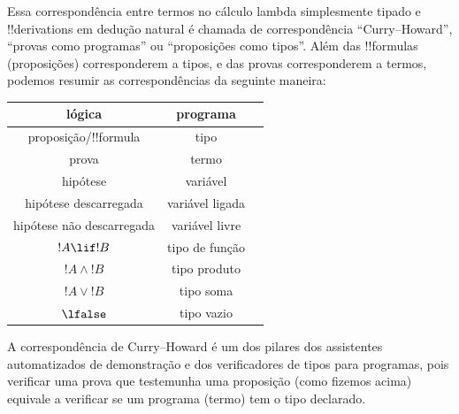 \documentclass[../../../include/open-logic-section]{subfiles}
\begin{document}
Essa correspondência entre termos no cálculo lambda simplesmente
tipado e !!{derivation}s em dedução natural é chamada de
correspondência ``Curry--Howard'', ``provas como programas'' ou
``proposições como tipos''. Além das !!{formula}s (proposições)
corresponderem a tipos, e das provas corresponderem a termos, podemos
resumir as correspondências da seguinte maneira:
\begin{center}
  \begin{tabular}{c c c}
    lógica & programa \\
    \hline
    proposição/!!{formula} & tipo \\
    prova & termo \\
    hipótese & variável \\
    hipótese descarregada & variável ligada \\
    hipótese não descarregada & variável livre \\
    $!A \lif !B$ & tipo de função \\
    $!A \land !B$ & tipo produto \\
    $!A \lor !B$ & tipo soma \\
    $\lfalse$ & tipo vazio \\
    \hline
  \end{tabular}
\end{center}

A correspondência de Curry--Howard é um dos pilares dos assistentes
automatizados de demonstração e dos verificadores de tipos para
programas, pois verificar uma prova que testemunha uma proposição
(como fizemos acima) equivale a verificar se um programa (termo) tem o
tipo declarado.
\end{document}
